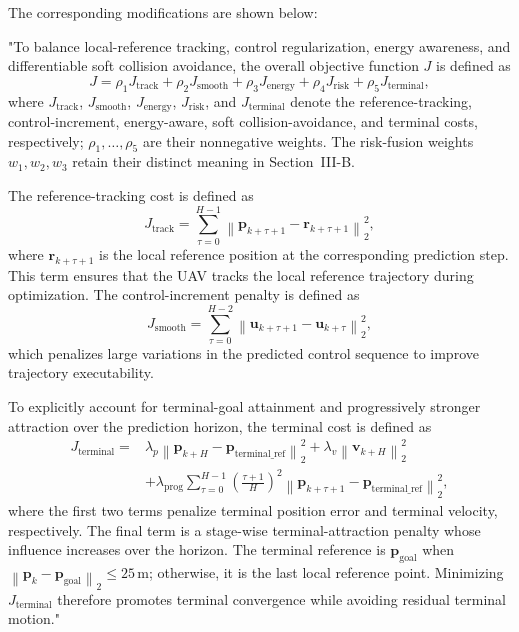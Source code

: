 \documentclass[12pt, twosides]{article}
\newcommand{\vect}[1]{\mathbf{#1}}
\theoremstyle{definition}
\begin{document}
The corresponding modifications are shown below:

"To balance local-reference tracking, control regularization, energy awareness, and differentiable soft collision avoidance, the overall objective function $J$ is defined as
\[
J = \rho_1 J_{\mathrm{track}} + \rho_2 J_{\mathrm{smooth}} + \rho_3 J_{\mathrm{energy}} + \rho_4 J_{\mathrm{risk}} + \rho_5 J_{\mathrm{terminal}},
\]
where $J_{\text{track}}$, $J_{\text{smooth}}$, $J_{\text{energy}}$, $J_{\text{risk}}$, and $J_{\text{terminal}}$ denote the reference-tracking, control-increment, energy-aware, soft collision-avoidance, and terminal costs, respectively; $\rho_1,\ldots,\rho_5$ are their nonnegative weights. The risk-fusion weights $w_1,w_2,w_3$ retain their distinct meaning in Section~III-B.

The reference-tracking cost is defined as
\[
J_{\mathrm{track}} = \sum_{\tau=0}^{H-1} \left\|\vect{p}_{k+\tau+1}-\vect{r}_{k+\tau+1}\right\|_2^2,
\]
where $\vect{r}_{k+\tau+1}$ is the local reference position at the corresponding prediction step. This term ensures that the UAV tracks the local reference trajectory during optimization. The control-increment penalty is defined as
\[
J_{\mathrm{smooth}} = \sum_{\tau=0}^{H-2} \left\|\vect{u}_{k+\tau+1}-\vect{u}_{k+\tau}\right\|_2^2,
\]
which penalizes large variations in the predicted control sequence to improve trajectory executability.

To explicitly account for terminal-goal attainment and progressively stronger attraction over the prediction horizon, the terminal cost is defined as
\[
\begin{aligned}
J_{\mathrm{terminal}} ={}& \lambda_p\left\|\vect{p}_{k+H}-\vect{p}_{\mathrm{terminal\_ref}}\right\|_2^2+\lambda_v\left\|\vect{v}_{k+H}\right\|_2^2 \\
&+\lambda_{\mathrm{prog}}\sum_{\tau=0}^{H-1}\left(\frac{\tau+1}{H}\right)^2\left\|\vect{p}_{k+\tau+1}-\vect{p}_{\mathrm{terminal\_ref}}\right\|_2^2,
\end{aligned}
\]
where the first two terms penalize terminal position error and terminal velocity, respectively. The final term is a stage-wise terminal-attraction penalty whose influence increases over the horizon. The terminal reference is $\vect{p}_{\text{goal}}$ when $\left\|\vect{p}_{k}-\vect{p}_{\text{goal}}\right\|_2\leq25\,\mathrm{m}$; otherwise, it is the last local reference point. Minimizing $J_{\text{terminal}}$ therefore promotes terminal convergence while avoiding residual terminal motion."
\end{document}
